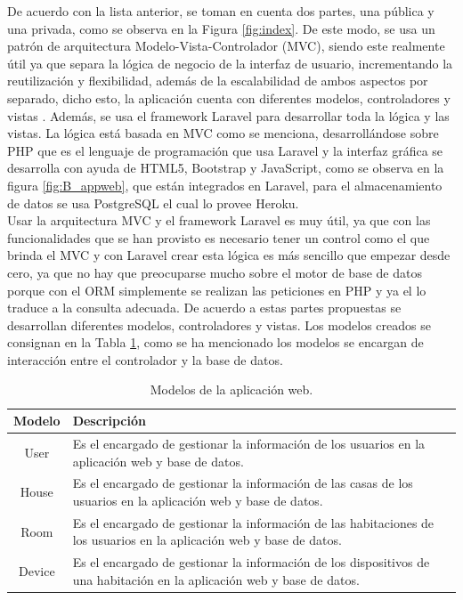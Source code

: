 De acuerdo con la lista anterior, se toman en cuenta dos partes, una pública y una privada, como se observa en la Figura \ref{fig:index}. De este modo, se usa un patrón de arquitectura Modelo-Vista-Controlador (MVC), siendo este realmente útil ya que separa la lógica de negocio de la interfaz de usuario, incrementando la reutilización y flexibilidad, además de la escalabilidad de ambos aspectos por separado, dicho esto, la aplicación cuenta con diferentes modelos, controladores y vistas \cite{MVC1}. Además, se usa el framework Laravel para desarrollar toda la lógica y las vistas. La lógica está basada en MVC como se menciona, desarrollándose sobre PHP que es el lenguaje de programación que usa Laravel y la interfaz gráfica se desarrolla con ayuda de HTML5, Bootstrap y JavaScript, como se observa en la figura \ref{fig:B_appweb}, que están integrados en Laravel, para el almacenamiento de datos se usa PostgreSQL el cual lo provee Heroku.\\

Usar la arquitectura MVC y el framework Laravel es muy útil, ya que con las funcionalidades que se han provisto es necesario tener un control como el que brinda el MVC y con Laravel crear esta lógica es más sencillo que empezar desde cero, ya que no hay que preocuparse mucho sobre el motor de base de datos porque con el ORM simplemente se realizan las peticiones en PHP y ya el lo traduce a la consulta adecuada. De acuerdo a estas partes propuestas se desarrollan diferentes modelos, controladores y vistas. Los modelos creados se consignan en la Tabla \ref{table:models}, como se ha mencionado los modelos se encargan de interacción entre el controlador y la base de datos.\\

\begin{table}[H]
	\begin{center}
		\caption{Modelos de la aplicación web.}
		\label{table:models}
		\begin{tabular}{|c|p{7cm}|}
			\hline 
			\textbf{Modelo} & \textbf{Descripción} \\ 
			\hline 
			User & Es el encargado de gestionar la información de los usuarios en la aplicación web y base de datos.\\ 
			\hline 
			House & Es el encargado de gestionar la información de las casas de los usuarios en la aplicación web y base de datos.\\ 
			\hline 
			Room & Es el encargado de gestionar la información de las habitaciones de los usuarios en la aplicación web y base de datos.\\ 
			\hline 
			Device & Es el encargado de gestionar la información de los dispositivos de una habitación en la aplicación web y base de datos.\\
			\hline
		\end{tabular} 
	\end{center}
\end{table}

